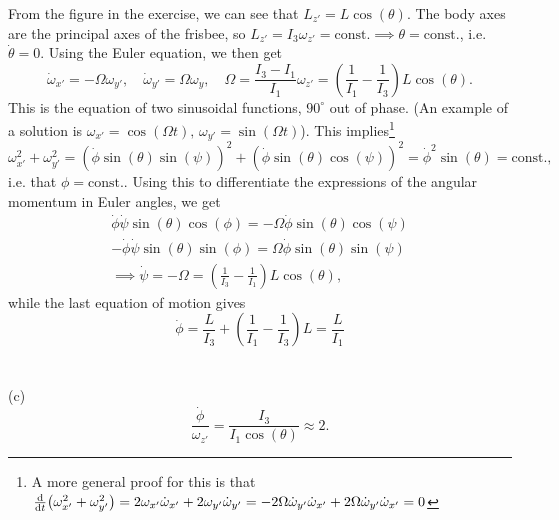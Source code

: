 \documentclass{article}
\begin{document}
        From the figure in the exercise, we can see that $L_{z'} = L \cos(\theta)$. The body axes are the principal axes of the frisbee, so $L_{z'} = I_3 \omega_{z'} = \mathrm{const.} \implies \theta = \mathrm{const.}$, i.e. $\dot \theta = 0$. Using the Euler equation, we then get
        \begin{equation*}
            \dot \omega_{x'} = -\Omega \omega_{y'}, \quad \dot \omega_{y'} = \Omega \omega_{y}, \quad \Omega = \frac{I_3 - I_1}{I_1} \omega_{z'} = \left(\frac{1}{I_1} - \frac{1}{I_3}\right) L \cos(\theta).
        \end{equation*}
        This is the equation of two sinusoidal functions, $90^\circ$ out of phase. (An example of a solution is $\omega_{x'} = \cos(\Omega t),\, \omega_{y'} = \sin(\Omega t)$). This implies\footnote{A more general proof for this is that $\dv t (\omega_{x'}^2 + \omega_{y'}^2) = 2\omega_{x'} \dot \omega_{x'} + 2 \omega_{y'} \dot \omega_{y'} = -2\Omega \dot \omega_{y'} \dot \omega_{x'} + 2\Omega \dot \omega_{y'} \dot \omega_{x'} = 0$ }
        \begin{equation*}
            \omega_{x'}^2 + \omega_{y'}^2 = \left( \dot \phi \sin(\theta) \sin(\psi) \right)^2 + \left( \dot \phi \sin(\theta)\cos(\psi) \right)^2 = \dot \phi^2 \sin(\theta) = \mathrm{const.},
        \end{equation*}
        i.e. that $\phi = \mathrm{const.}$. Using this to differentiate the expressions of the angular momentum in Euler angles, we get
        \begin{align*}
            \dot \phi \dot \psi \sin(\theta)\cos(\phi) = -\Omega \dot \phi \sin(\theta)\cos(\psi) \\
            -\dot \phi \dot \psi \sin(\theta)\sin(\phi) = \Omega \dot \phi \sin(\theta)\sin(\psi) \\
            \implies \dot \psi = -\Omega = \left(\frac{1}{I_3} - \frac{1}{I_1}\right) L \cos(\theta),
        \end{align*}
        while the last equation of motion gives
        \begin{equation*}
            \dot \phi = \frac{L}{I_3} + \left(\frac{1}{I_1} - \frac{1}{I_3}\right) L = \frac{L}{I_1}
        \end{equation*}
        \\ \\
        (c)
        \begin{equation*}
            \frac{\dot \phi}{\omega_{z'}} = \frac{I_3}{I_1 \cos(\theta)} \approx 2.
        \end{equation*}
\end{document}
